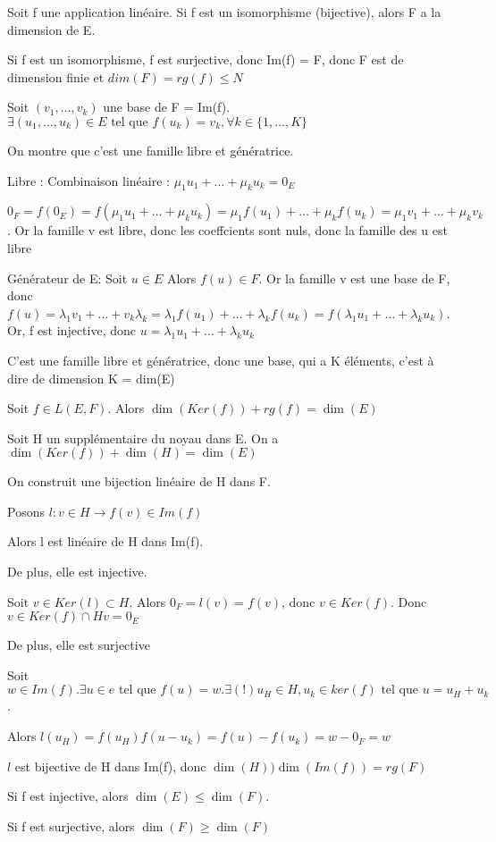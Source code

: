 \documentclass[french]{yLectureNote}
\newcommand{\tq}[0]{\text{ tel que }}
\begin{document}
\begin{proposition}
Soit f une application linéaire. Si f est un isomorphisme (bijective), alors F a la dimension de E.
\end{proposition}
\begin{myproof}
 Si f est un isomorphisme, f est surjective, donc Im(f) = F, donc F est de dimension finie et $dim(F) = rg(f)\leq N$

 Soit $(v_1,\dots,v_k)$ une base de F = Im(f). $\exists (u_1,\dots,u_k)\in E \tq f(u_k) = v_k,\forall k\in \{1,\dots,K\}$

 On montre que c'est une famille libre et génératrice.

 Libre : Combinaison linéaire : $\mu_1u_1+\dots+\mu_ku_k = 0_E$

 $0_F = f(0_E) = f(\mu_1u_1+\dots+\mu_ku_k) = \mu_1f(u_1)+\dots+\mu_kf(u_k) = \mu_1v_1+\dots+\mu_kv_k$. Or la famille v est libre, donc les coeffcients sont nuls, donc la famille des u est libre


 Générateur de E: Soit $u\in E$ Alors $f(u)\in F$. Or la famille v est une base de F, donc $f(u) = \lambda_1v_1+\dots+v_k\lambda_k = \lambda_1f(u_1)+\dots+\lambda_kf(u_k) = f(\lambda_1u_1+\dots+\lambda_ku_k)$. Or, f est injective, donc $u = \lambda_1u_1+\dots+\lambda_ku_k$


 C'est une famille libre et génératrice, donc une base, qui a K éléments, c'est à dire de dimension K = dim(E)
\end{myproof}
\begin{theorem}
 Soit \(f\in L(E,F)\). Alors \(\dim(Ker(f))+rg(f) = \dim(E)\)
\end{theorem}
\begin{myproof}
 Soit H un supplémentaire du noyau dans E. On a $\dim(Ker(f))+\dim(H)=\dim(E)$

 On construit une bijection linéaire de H dans F.

 Posons $l : v\in H \to f(v)\in Im(f)$

 Alors l est linéaire de H dans Im(f).

 De plus, elle est injective.

 Soit $v\in Ker(l)\subset H$. Alors $0_F = l(v) = f(v)$, donc $v\in Ker(f)$. Donc $v\in Ker(f) \cap H v = 0_E$

 De plus, elle est surjective

 Soit $w\in Im(f). \exists u\in e \tq f(u)=w. \exists(!) u_H\in H, u_k\in ker(f) \tq u = u_H+u_k$.

 Alors $l(u_H) = f(u_H) f(u-u_k) = f(u) - f(u_k) = w - 0_F = w$

 $l$ est bijective de H dans Im(f), donc $\dim(H) ) \dim(Im(f)) = rg(F)$
\end{myproof}
\begin{proposition}
Si f est injective, alors \(\dim(E)\leq \dim(F)\).

Si f est surjective, alors \(\dim(F)\geq \dim(F)\)
\end{proposition}
\end{document}
